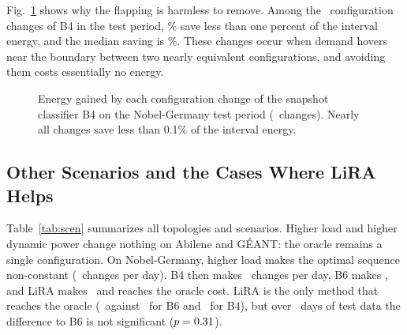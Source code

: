 \documentclass[journal]{IEEEtran}
\begin{document}
Fig.~\ref{fig:gain} shows why the flapping is harmless to remove. Among the \gainChanges\ configuration changes of B4 in the test period, \gainLowShare\% save less than one percent of the interval energy, and the median saving is \gainMedian\%. These changes occur when demand hovers near the boundary between two nearly equivalent configurations, and avoiding them costs essentially no energy.

\begin{figure}[t]
\centering
{}
\caption{Energy gained by each configuration change of the snapshot classifier B4 on the Nobel-Germany test period (\gainChanges\ changes). Nearly all changes save less than 0.1\% of the interval energy.}
\label{fig:gain}
\end{figure}

\subsection{Other Scenarios and the Cases Where LiRA Helps}

Table~\ref{tab:scen} summarizes all topologies and scenarios. Higher load and higher dynamic power change nothing on Abilene and G\'{E}ANT: the oracle remains a single configuration. On Nobel-Germany, higher load makes the optimal sequence non-constant (\nobhlLiRAchg\ changes per day). B4 then makes \nobhlBFourchg\ changes per day, B6 makes \nobhlBsixChg, and LiRA makes \nobhlLiRAchg\ and reaches the oracle cost. LiRA is the only method that reaches the oracle (\nobhlJLiRA\ against \nobhlJBSix\ for B6 and \nobhlJBFour\ for B4), but over \nobTestDays\ days of test data the difference to B6 is not significant ($p=0.31$).

\begin{table}[t]
\centering
\caption{All Topologies and Scenarios: Configuration Changes per Day, Total Cost $J$, and Holm-Adjusted $p$-Values of the Wilcoxon Test on Per-Day Cost (Mean over Five Seeds)}
\label{tab:scen}
\footnotesize
\setlength{\tabcolsep}{3.5pt}

\end{table}
\end{document}
